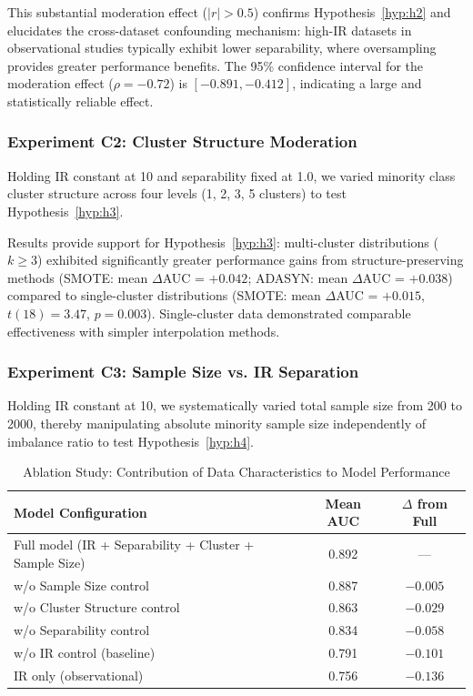 \documentclass{ijSmartGrid}
\theoremstyle{definition}
\begin{document}
\indent This substantial moderation effect ($|r| > 0.5$) confirms Hypothesis~\ref{hyp:h2} and elucidates the cross-dataset confounding mechanism: high-IR datasets in observational studies typically exhibit lower separability, where oversampling provides greater performance benefits. The 95\% confidence interval for the moderation effect ($\rho = -0.72$) is $[-0.891, -0.412]$, indicating a large and statistically reliable effect.

\subsubsection{Experiment C2: Cluster Structure Moderation}
\indent Holding IR constant at 10 and separability fixed at 1.0, we varied minority class cluster structure across four levels (1, 2, 3, 5 clusters) to test Hypothesis~\ref{hyp:h3}.

Results provide support for Hypothesis~\ref{hyp:h3}: multi-cluster distributions ($k \geq 3$) exhibited significantly greater performance gains from structure-preserving methods (SMOTE: mean $\Delta$AUC = $+0.042$; ADASYN: mean $\Delta$AUC = $+0.038$) compared to single-cluster distributions (SMOTE: mean $\Delta$AUC = $+0.015$, $t(18) = 3.47$, $p = 0.003$). Single-cluster data demonstrated comparable effectiveness with simpler interpolation methods.

\subsubsection{Experiment C3: Sample Size vs. IR Separation}
\indent Holding IR constant at 10, we systematically varied total sample size from 200 to 2000, thereby manipulating absolute minority sample size independently of imbalance ratio to test Hypothesis~\ref{hyp:h4}.

\begin{table}[!ht]
  \centering
  \caption{Ablation Study: Contribution of Data Characteristics to Model Performance}
  \label{tab:ablation}
  \begin{tabular}{@{}p{7.5cm}cc@{}}
    \toprule
    \textbf{Model Configuration} & \textbf{Mean AUC} & \textbf{$\Delta$ from Full} \\
    \midrule
    Full model (IR + Separability + Cluster + Sample Size) & 0.892 & --- \\
    \quad w/o Sample Size control & 0.887 & $-0.005$ \\
    \quad w/o Cluster Structure control & 0.863 & $-0.029$ \\
    \quad w/o Separability control & 0.834 & $-0.058$ \\
    \quad w/o IR control (baseline) & 0.791 & $-0.101$ \\
    \midrule
    IR only (observational) & 0.756 & $-0.136$ \\
    \bottomrule
  \end{tabular}
\end{table}
\end{document}
